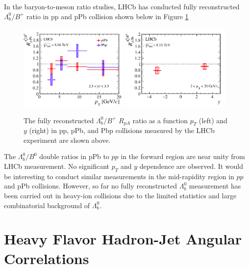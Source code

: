 In the baryon-to-meson ratio studies, LHCb has conducted fully reconstructed $\Lambda_b^0/B^+$ ratio in pp and pPb collision \cite{LHCbLambdaB} shown below in Figure \ref{LHCbLambda}


\begin{figure}[hbtp]
\begin{center}
\includegraphics[width=0.48\textwidth]{Figures/Chapter2/LHCbRpAPt.png}
\includegraphics[width=0.48\textwidth]{Figures/Chapter2/LHCbRpAy.png}
\caption{The fully reconstructed $\Lambda_b^0/B^+$ $R_{pA}$ ratio as a function $p_T$ (left) and $y$ (right) in pp, pPb, and Pbp collisions measured by the LHCb experiment are shown above.}
\label{LHCbLambda}
\end{center}
\end{figure}   

The $\Lambda_b^0/B^0$ double ratios in pPb to $pp$ in the forward region are near unity from LHCb measurement. No significant $p_T$ and $y$ dependence are observed. It would be interesting to conduct similar measurements in the mid-rapidity region in $pp$ and pPb collisions. However, so far no fully reconstructed $\Lambda_b^0$ measurement has been carried out in heavy-ion collisions due to the limited statistics and large combinatorial background of $\Lambda_b^0$. 



\section{Heavy Flavor Hadron-Jet Angular Correlations}

